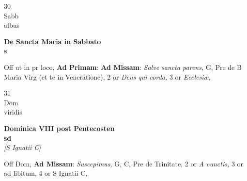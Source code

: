 \documentclass[10pt, openany]{book}
\begin{document}
        \begin{center}
            \begin{minipage}{3.5in}
                \vspace{2em}
                \begin{minipage}{0.5in}
                    {\Huge 30} \\
                    {\normalsize Sabb} \\
                    {\normalsize albus}
                \end{minipage}
                \begin{minipage}{3.0in}
                    \textbf{ \large De Sancta Maria in Sabbato \\
                    \textnormal{\normalsize s}} \\ 
                \end{minipage}
                \begin{justify}Off ut in pr loco, \textbf{Ad Primam}: \textbf{Ad Missam}: \textit{Salve sancta parens,} G, Pre de B Maria Virg (et te in Veneratione), 2 or \textit{Deus qui corda,} 3 or \textit{Ecclesiæ,}  
                \end{justify}
            \end{minipage}
        \end{center}
    
        \begin{center}
            \begin{minipage}{3.5in}
                \vspace{2em}
                \begin{minipage}{0.5in}
                    {\Huge 31} \\
                    {\normalsize Dom} \\
                    {\normalsize viridis}
                \end{minipage}
                \begin{minipage}{3.0in}
                    \textbf{ \large Dominica VIII post Pentecosten \\
                    \textnormal{\normalsize sd}} \\ \textit{[S Ignatii C]} \\ 
                \end{minipage}
                \begin{justify}Off Dom, \textbf{Ad Missam}: \textit{Suscepimus,} G, C, Pre de Trinitate, 2 or \textit{A cunctis,} 3 or ad libitum, 4 or S Ignatii C,  
                \end{justify}
            \end{minipage}
        \end{center}
    
\end{document}
